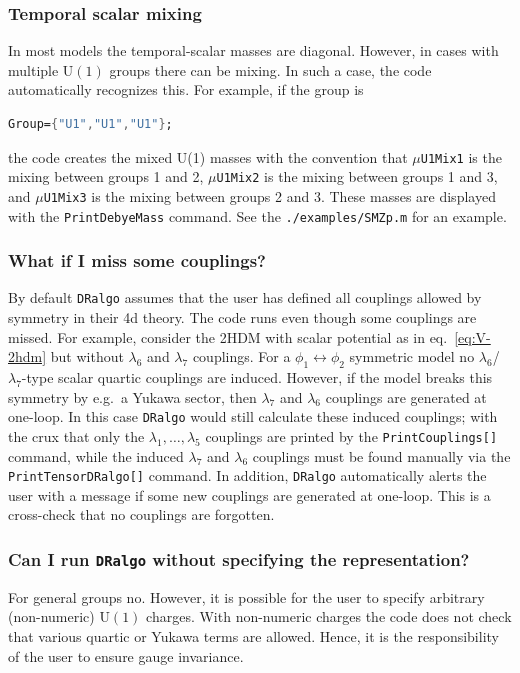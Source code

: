\documentclass[11pt]{article}
\def\dralgo{{\tt DRalgo}}
\begin{document}
%
\subsubsection{Temporal scalar mixing}
In most models the temporal-scalar masses are diagonal.
However, in cases with multiple $\mathrm{U}(1)$ groups there can be mixing.
In such a case,
the code automatically recognizes this.
For example, if the group is 
\begin{lstlisting}[language=Mathematica,mathescape=true]
Group={"U1","U1","U1"};
\end{lstlisting}
the code creates the mixed U(1) masses with
the convention that
{\tt $\mu$U1Mix1} is the mixing between groups 1 and 2, 
{\tt $\mu$U1Mix2} is the mixing between groups 1 and 3, and
{\tt $\mu$U1Mix3} is the mixing between groups 2 and 3.
These masses are displayed with the {\tt PrintDebyeMass} command.
See the {\tt ./examples/SMZp.m} for an example.

%
\subsubsection{What if I miss some couplings?}
By default \dralgo{} assumes that
the user has defined all couplings allowed by symmetry in their 4d theory.
The code runs even though some couplings are missed.
For example, consider
the 2HDM with scalar potential as in eq.~\eqref{eq:V-2hdm} but 
without
$\lambda_6$ and
$\lambda_7$ couplings.
For a
$\phi_1 \leftrightarrow \phi_2$ symmetric model no
$\lambda_6$/$\lambda_7$-type scalar quartic couplings are induced.
However,
if the model breaks this symmetry by e.g.\ a Yukawa sector, then
$\lambda_7$ and
$\lambda_6$ couplings are generated at one-loop.
In this case \dralgo{} would still calculate these induced couplings;
with the crux that only the
$\lambda_1,\ldots,\lambda_5$ couplings are printed by
the {\tt PrintCouplings[]} command,
while the induced
$\lambda_7$ and 
$\lambda_6$ couplings must be found manually via
the {\tt PrintTensorDRalgo[]} command. 
In addition, \dralgo{} automatically alerts the user with a message
if some new couplings are generated at one-loop.
This is a cross-check that no couplings are forgotten.


%
\subsubsection{Can I run \dralgo{} without specifying the representation?}
For general groups no.
However, it is possible for the user to specify arbitrary (non-numeric)
$\mathrm{U}(1)$ charges.
With non-numeric charges the code does not check that various
quartic or
Yukawa terms are allowed.
Hence, it is the responsibility of the user to ensure gauge invariance.
\end{document}
